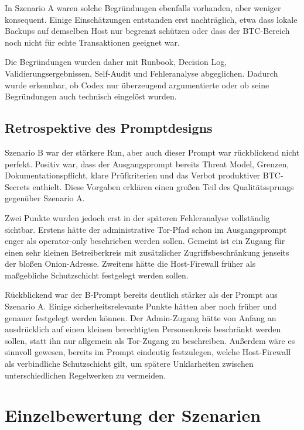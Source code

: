 In Szenario A waren solche Begründungen ebenfalls vorhanden, aber weniger konsequent. Einige Einschätzungen entstanden erst nachträglich, etwa dass lokale Backups auf demselben Host nur begrenzt schützen oder dass der \ac{BTC}-Bereich noch nicht für echte Transaktionen geeignet war.

Die Begründungen wurden daher mit Runbook, Decision Log, Validierungsergebnissen, Self-Audit und Fehleranalyse abgeglichen. Dadurch wurde erkennbar, ob Codex nur überzeugend argumentierte oder ob seine Begründungen auch technisch eingelöst wurden.


\subsection{Retrospektive des Promptdesigns}

Szenario B war der stärkere Run, aber auch dieser Prompt war rückblickend nicht perfekt. Positiv war, dass der Ausgangsprompt bereits Threat Model, Grenzen, Dokumentationspflicht, klare Prüfkriterien und das Verbot produktiver \ac{BTC}-Secrets enthielt. Diese Vorgaben erklären einen großen Teil des Qualitätssprungs gegenüber Szenario A.

Zwei Punkte wurden jedoch erst in der späteren Fehleranalyse vollständig sichtbar. Erstens hätte der administrative Tor-Pfad schon im Ausgangsprompt enger als \glqq operator-only\grqq{} beschrieben werden sollen. Gemeint ist ein Zugang für einen sehr kleinen Betreiberkreis mit zusätzlicher Zugriffsbeschränkung jenseits der bloßen Onion-Adresse. Zweitens hätte die Host-Firewall früher als maßgebliche Schutzschicht festgelegt werden sollen.

Rückblickend war der B-Prompt bereits deutlich stärker als der Prompt aus Szenario A. Einige sicherheitsrelevante Punkte hätten aber noch früher und genauer festgelegt werden können. Der Admin-Zugang hätte von Anfang an ausdrücklich auf einen kleinen berechtigten Personenkreis beschränkt werden sollen, statt ihn nur allgemein als Tor-Zugang zu beschreiben. Außerdem wäre es sinnvoll gewesen, bereits im Prompt eindeutig festzulegen, welche Host-Firewall als verbindliche Schutzschicht gilt, um spätere Unklarheiten zwischen unterschiedlichen Regelwerken zu vermeiden.


\section{Einzelbewertung der Szenarien}
\label{sec:einzelbewertung}

